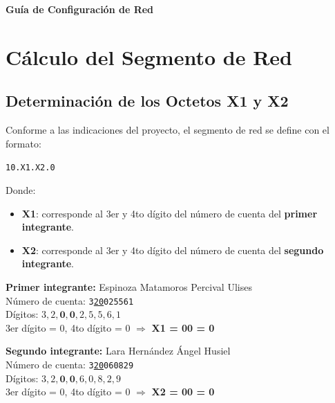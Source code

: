 \documentclass[letterpaper,11pt]{article}
\begin{document}
\begin{titlepage}
\centering
\vspace*{2cm}
{\Huge\textbf{Guía de Configuración de Red}}\\[0.5cm]
\end{titlepage}

\newpage
\tableofcontents
\newpage

\section{Cálculo del Segmento de Red}

\subsection{Determinación de los Octetos X1 y X2}

Conforme a las indicaciones del proyecto, el segmento de red se define con el formato:

\begin{center}
\texttt{10.X1.X2.0}
\end{center}

Donde:
\begin{itemize}
    \item \textbf{X1}: corresponde al 3er y 4to dígito del número de cuenta del \textbf{primer integrante}.
    \item \textbf{X2}: corresponde al 3er y 4to dígito del número de cuenta del \textbf{segundo integrante}.
\end{itemize}

\textbf{Primer integrante:} Espinoza Matamoros Percival Ulises \\
Número de cuenta: \texttt{3\underline{20}025561} \\
Dígitos: $3, 2, \mathbf{0}, \mathbf{0}, 2, 5, 5, 6, 1$ \\
3er dígito = 0, 4to dígito = 0 $\Rightarrow$ \textbf{X1 = 00 = 0}

\textbf{Segundo integrante:} Lara Hernández Ángel Husiel \\
Número de cuenta: \texttt{3\underline{20}060829} \\
Dígitos: $3, 2, \mathbf{0}, \mathbf{0}, 6, 0, 8, 2, 9$ \\
3er dígito = 0, 4to dígito = 0 $\Rightarrow$ \textbf{X2 = 00 = 0}
\end{document}
